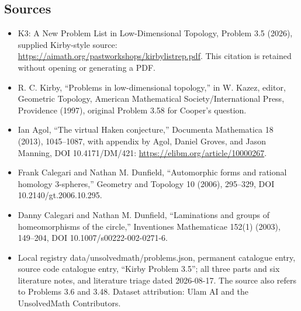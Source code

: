 \documentclass[11pt]{article}
\begin{document}
\subsection{Sources}
\begin{itemize}
\item K3: A New Problem List in Low-Dimensional Topology, Problem 3.5 (2026), supplied Kirby-style source: \url{https://aimath.org/pastworkshops/kirbylistrep.pdf}. This citation is retained without opening or generating a PDF.
\item [Kir97] R. C. Kirby, ``Problems in low-dimensional topology,'' in W. Kazez, editor, Geometric Topology, American Mathematical Society/International Press, Providence (1997), original Problem 3.58 for Cooper's question.
\item [Ago13] Ian Agol, ``The virtual Haken conjecture,'' Documenta Mathematica 18 (2013), 1045--1087, with appendix by Agol, Daniel Groves, and Jason Manning, DOI 10.4171/DM/421: \url{https://elibm.org/article/10000267}.
\item [CD06] Frank Calegari and Nathan M. Dunfield, ``Automorphic forms and rational homology 3-spheres,'' Geometry and Topology 10 (2006), 295--329, DOI 10.2140/gt.2006.10.295.
\item [CD03] Danny Calegari and Nathan M. Dunfield, ``Laminations and groups of homeomorphisms of the circle,'' Inventiones Mathematicae 152(1) (2003), 149--204, DOI 10.1007/s00222-002-0271-6.
\item Local registry data/unsolvedmath/problems.json, permanent catalogue entry, source code catalogue entry, ``Kirby Problem 3.5''; all three parts and six literature notes, and literature triage dated 2026-08-17. The source also refers to Problems 3.6 and 3.48. Dataset attribution: Ulam AI and the UnsolvedMath Contributors.
\end{itemize}
\end{document}
